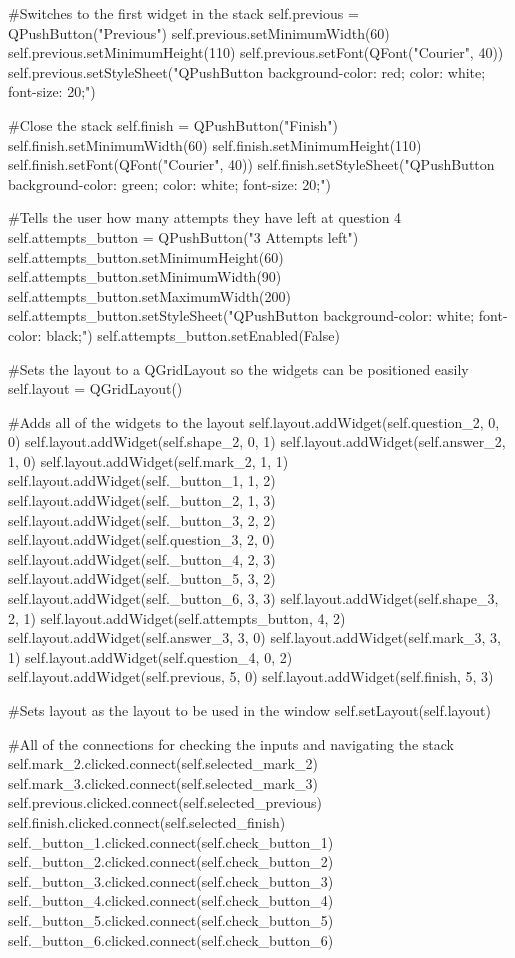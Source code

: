 \begin{landscape}
\begin{python}
        #Switches to the first widget in the stack
        self.previous = QPushButton("Previous")
        self.previous.setMinimumWidth(60)
        self.previous.setMinimumHeight(110)
        self.previous.setFont(QFont("Courier", 40))
        self.previous.setStyleSheet("QPushButton {background-color: red; color: white; font-size: 20;}")

        #Close the stack
        self.finish = QPushButton("Finish")
        self.finish.setMinimumWidth(60)
        self.finish.setMinimumHeight(110)
        self.finish.setFont(QFont("Courier", 40))
        self.finish.setStyleSheet("QPushButton {background-color: green; color: white; font-size: 20;}")

        #Tells the user how many attempts they have left at question 4
        self.attempts_button = QPushButton("3 Attempts left")
        self.attempts_button.setMinimumHeight(60)
        self.attempts_button.setMinimumWidth(90)
        self.attempts_button.setMaximumWidth(200)
        self.attempts_button.setStyleSheet("QPushButton {background-color: white; font-color: black;}")
        self.attempts_button.setEnabled(False)

        #Sets the layout to a QGridLayout so the widgets can be positioned easily
        self.layout = QGridLayout()

        #Adds all of the widgets to the layout
        self.layout.addWidget(self.question_2, 0, 0)
        self.layout.addWidget(self.shape_2, 0, 1)
        self.layout.addWidget(self.answer_2, 1, 0)
        self.layout.addWidget(self.mark_2, 1, 1)
        self.layout.addWidget(self._button_1, 1, 2)
        self.layout.addWidget(self._button_2, 1, 3)
        self.layout.addWidget(self._button_3, 2, 2)
        self.layout.addWidget(self.question_3, 2, 0)
        self.layout.addWidget(self._button_4, 2, 3)
        self.layout.addWidget(self._button_5, 3, 2)
        self.layout.addWidget(self._button_6, 3, 3)
        self.layout.addWidget(self.shape_3, 2, 1)
        self.layout.addWidget(self.attempts_button, 4, 2)
        self.layout.addWidget(self.answer_3, 3, 0)
        self.layout.addWidget(self.mark_3, 3, 1)
        self.layout.addWidget(self.question_4, 0, 2)
        self.layout.addWidget(self.previous, 5, 0)
        self.layout.addWidget(self.finish, 5, 3)

        #Sets layout as the layout to be used in the window
        self.setLayout(self.layout)

        #All of the connections for checking the inputs and navigating the stack
        self.mark_2.clicked.connect(self.selected_mark_2)
        self.mark_3.clicked.connect(self.selected_mark_3)
        self.previous.clicked.connect(self.selected_previous)
        self.finish.clicked.connect(self.selected_finish)
        self._button_1.clicked.connect(self.check_button_1)
        self._button_2.clicked.connect(self.check_button_2)
        self._button_3.clicked.connect(self.check_button_3)
        self._button_4.clicked.connect(self.check_button_4)
        self._button_5.clicked.connect(self.check_button_5)
        self._button_6.clicked.connect(self.check_button_6)


\end{python}
\end{landscape}
